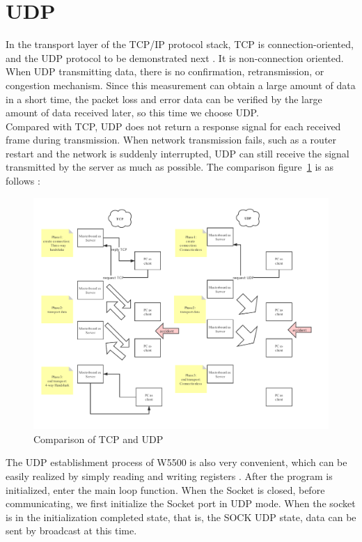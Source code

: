 \section{UDP}
\label{sec:UDP}
In the transport layer of the TCP/IP protocol stack, TCP is connection-oriented, and the UDP protocol to be demonstrated next \cite{madhuri2016performance}. It is non-connection oriented.
\\
When UDP transmitting data, there is no confirmation, retransmission, or congestion mechanism. Since this measurement can obtain a large amount of data in a short time, the packet loss and error data can be verified by the large amount of data received later, so this time we choose UDP.
\\
Compared with TCP, UDP does not return a response signal for each received frame during transmission. When network transmission fails, such as a router restart and the network is suddenly interrupted, UDP can still receive the signal transmitted by the server as much as possible. The comparison figure~\ref{fig:2.11}  is as follows :
\begin{figure}[!ht]
	\centering
	\includegraphics[scale=0.7]{grafiken/2.11.pdf}
	\caption{Comparison of TCP and UDP} 
	\label{fig:2.11}
\end{figure}
\FloatBarrier
The UDP establishment process of W5500 is also very convenient, which can be easily realized by simply reading and writing registers \cite{fodisch2016synchronous}. After the program is initialized, enter the main loop function. When the Socket is closed, before communicating, we first initialize the Socket port in UDP mode. When the socket is in the initialization completed state, that is, the SOCK UDP state, data can be sent by broadcast at this time.
